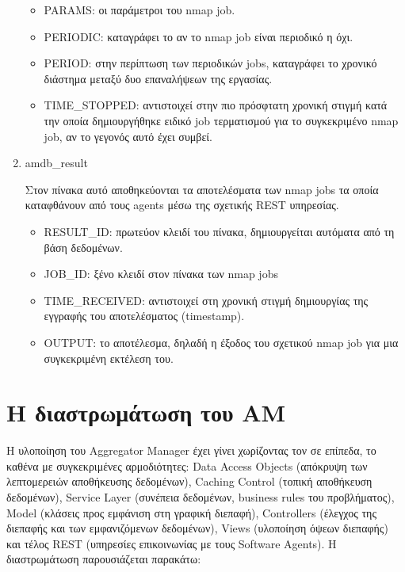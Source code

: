 \documentclass[a4paper,11pt]{article}
\begin{document}
\begin{sloppypar}
\begin{enumerate}
\begin{itemize}
\item PARAMS: οι παράμετροι του nmap job.

\item PERIODIC: καταγράφει το αν το nmap job είναι περιοδικό η όχι.

\item PERIOD: στην περίπτωση των περιοδικών jobs, καταγράφει το χρονικό διάστημα μεταξύ δυο επαναλήψεων της εργασίας.

\item TIME\_STOPPED: αντιστοιχεί στην πιο πρόσφτατη χρονική στιγμή κατά την οποία δημιουργήθηκε ειδικό job τερματισμού για το συγκεκριμένο nmap job, αν το γεγονός αυτό έχει συμβεί.

\end{itemize}


\item amdb\_result

Στον πίνακα αυτό αποθηκεύονται τα αποτελέσματα των nmap jobs τα οποία καταφθάνουν από τους agents μέσω της σχετικής REST υπηρεσίας.
\begin{itemize}

\item RESULT\_ID: πρωτεύον κλειδί του πίνακα, δημιουργείται αυτόματα από τη βάση δεδομένων.

\item JOB\_ID: ξένο κλειδί στον πίνακα των nmap jobs

\item TIME\_RECEIVED: αντιστοιχεί στη χρονική στιγμή δημιουργίας της εγγραφής του αποτελέσματος (timestamp).

\item OUTPUT: το αποτέλεσμα, δηλαδή η έξοδος του σχετικού nmap job για μια συγκεκριμένη εκτέλεση του.

\end{itemize}

\end{enumerate}


\newpage


\section{Η διαστρωμάτωση του AM}

Η υλοποίηση του Aggregator Manager έχει γίνει χωρίζοντας τον σε επίπεδα, το καθένα με συγκεκριμένες αρμοδιότητες: Data Access Objects (απόκρυψη των λεπτομερειών αποθήκευσης δεδομένων), Caching Control (τοπική αποθήκευση δεδομένων), Service Layer (συνέπεια δεδομένων, business rules του προβλήματος), Model (κλάσεις προς εμφάνιση στη γραφική διεπαφή), Controllers (έλεγχος της διεπαφής και των εμφανιζόμενων δεδομένων), Views (υλοποίηση όψεων διεπαφής) και τέλος REST (υπηρεσίες επικοινωνίας με τους Software Agents). Η διαστρωμάτωση παρουσιάζεται παρακάτω:
\\


\end{sloppypar}
\end{document}
